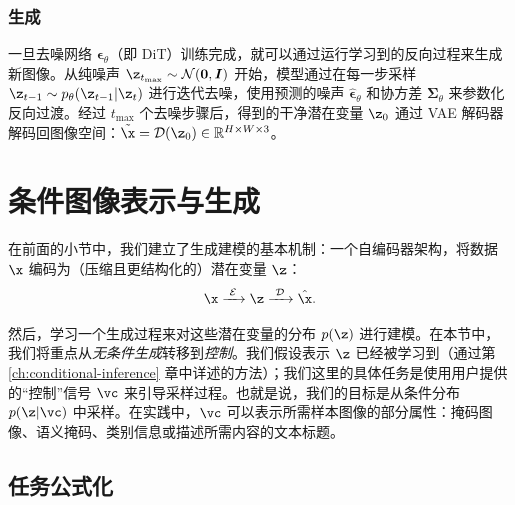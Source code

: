 \documentclass[../../book-main_zh.tex]{subfiles}
\begin{document}
\subsubsection{生成}
一旦去噪网络 $\boldsymbol{\epsilon}_\theta$（即 DiT）训练完成，就可以通过运行学习到的反向过程来生成新图像。从纯噪声 $\z_{t_{\max}} \sim \mathcal{N}(\boldsymbol{0}, \boldsymbol{I})$ 开始，模型通过在每一步采样 $\z_{t-1} \sim p_\theta(\z_{t-1} | \z_t)$ 进行迭代去噪，使用预测的噪声 $\hat{\boldsymbol{\epsilon}}_\theta$ 和协方差 $\boldsymbol{\Sigma}_\theta$ 来参数化反向过渡。经过 $t_{\max}$ 个去噪步骤后，得到的干净潜在变量 $\z_0$ 通过 VAE 解码器解码回图像空间：$\tilde{\x} = \mathcal{D}(\z_0) \in \mathbb{R}^{H \times W \times 3}$。







\section{条件图像表示与生成}
\label{sec:cond_gen}

在前面的小节中，我们建立了生成建模的基本机制：一个自编码器架构，将数据 $\x$ 编码为（压缩且更结构化的）潜在变量 $\z$：
\begin{equation}
\x\xrightarrow{\hspace{1mm} \mathcal{E} \hspace{1mm}} \z
\xrightarrow{\hspace{1mm} \mathcal{D} \hspace{1mm}} \hat{\x}.
\end{equation}

然后，学习一个生成过程来对这些潜在变量的分布 $p(\z)$ 进行建模。在本节中，我们将重点从\textit{无条件生成}转移到\textit{控制}。我们假设表示 $\z$ 已经被学习到（通过第 \ref{ch:conditional-inference} 章中详述的方法）；我们这里的具体任务是使用用户提供的“控制”信号 $\vc$ 来引导采样过程。也就是说，我们的目标是从条件分布 $p(\z | \vc)$ 中采样。在实践中，$\vc$ 可以表示所需样本图像的部分属性：掩码图像、语义掩码、类别信息或描述所需内容的文本标题。

\subsection{任务公式化}
\label{subsec:cond_problem}
\end{document}
